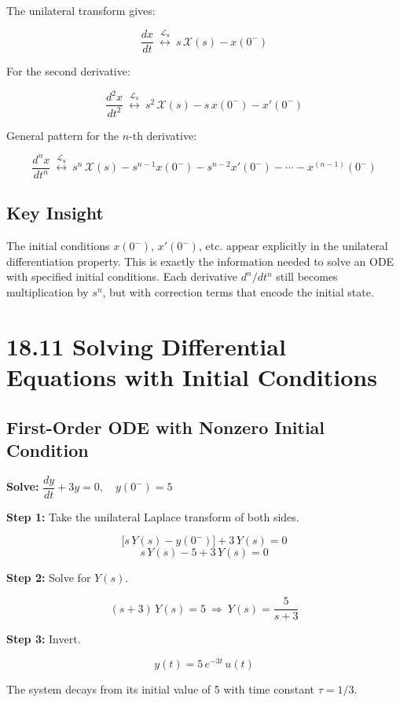 \documentclass[11pt]{article}
\begin{document}
The unilateral transform gives:

\[\frac{dx}{dt} \ \stackrel{\mathcal{L}_u}{\longleftrightarrow}\ s\, \mathcal{X}(s) - x(0^-)\]

For the second derivative:

\[\frac{d^2 x}{dt^2} \ \stackrel{\mathcal{L}_u}{\longleftrightarrow}\ s^2\, \mathcal{X}(s) - s\, x(0^-) - x'(0^-)\]

General pattern for the $n$-th derivative:

\[\frac{d^n x}{dt^n} \ \stackrel{\mathcal{L}_u}{\longleftrightarrow}\ s^n\, \mathcal{X}(s) - s^{n-1} x(0^-) - s^{n-2} x'(0^-) - \cdots - x^{(n-1)}(0^-)\]

\subsection*{Key Insight}

The initial conditions $x(0^-)$, $x'(0^-)$, etc. appear explicitly in the unilateral differentiation property. This is exactly the information needed to solve an ODE with specified initial conditions. Each derivative $d^n/dt^n$ still becomes multiplication by $s^n$, but with correction terms that encode the initial state.

\section*{18.11 Solving Differential Equations with Initial Conditions}

\subsection*{First-Order ODE with Nonzero Initial Condition}

\textbf{Solve:} $\dfrac{dy}{dt} + 3y = 0, \quad y(0^-) = 5$

\textbf{Step 1:} Take the unilateral Laplace transform of both sides.

\[\bigl[s\, Y(s) - y(0^-)\bigr] + 3\, Y(s) = 0\]
\[s\, Y(s) - 5 + 3\, Y(s) = 0\]

\textbf{Step 2:} Solve for $Y(s)$.

\[(s+3)\, Y(s) = 5 \ \Rightarrow\ Y(s) = \frac{5}{s+3}\]

\textbf{Step 3:} Invert.

\[y(t) = 5\, e^{-3t}\, u(t)\]

The system decays from its initial value of 5 with time constant $\tau = 1/3$.
\end{document}
